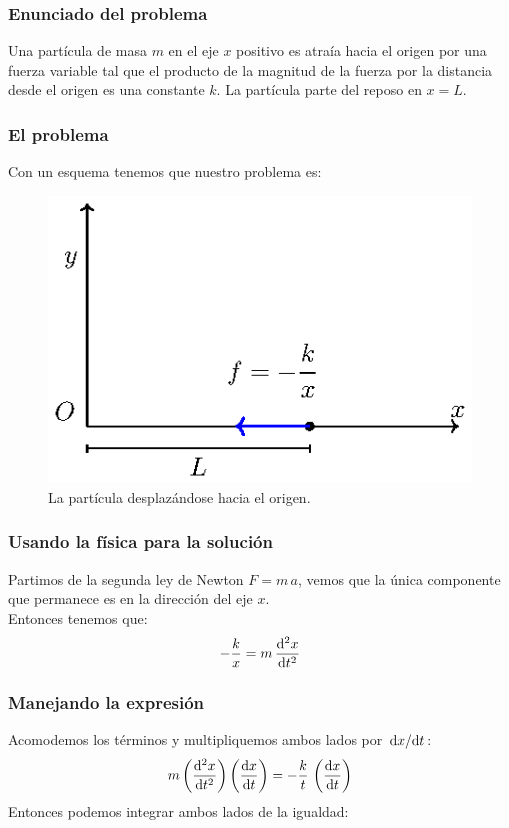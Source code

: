 \documentclass[12pt]{beamer}
\begin{document}
\begin{frame}
\frametitle{Enunciado del problema}
Una partícula de masa $m$ en el eje $x$ positivo es atraía hacia el origen por una fuerza variable tal que el producto de la magnitud de la fuerza por la distancia desde el origen es una constante $k$. La partícula parte del reposo en $x = L$.
\\
\bigskip
\pause
{}
\end{frame}
\begin{frame}
\frametitle{El problema}
Con un esquema tenemos que nuestro problema es:
\begin{figure}
    \centering
    \includegraphics[scale=1]{Imagenes/Ejercicio_Gamma_Particula.eps}
    \caption{La partícula desplazándose hacia el origen.}
\end{figure}
\end{frame}
\begin{frame}
\frametitle{Usando la física para la solución}
Partimos de la segunda ley de Newton $F = m \, a$, vemos que la única componente que permanece es en la dirección del eje $x$.
\\
\bigskip
\pause
Entonces tenemos que:
\begin{align*}
- \dfrac{k}{x} = m \, \dv[2]{x}{t}
\end{align*}
\end{frame}
\begin{frame}
\frametitle{Manejando la expresión}
Acomodemos los términos y multipliquemos ambos lados por $\dv*{x}{t}$:
\pause
\begin{align*}
m \left( \dv[2]{x}{t} \right) \left( \dv{x}{t} \right) = - \dfrac{k}{t} \,  \left( \dv{x}{t} \right)
\end{align*}
\pause
Entonces podemos integrar ambos lados de la igualdad:
\end{frame}
\end{document}
